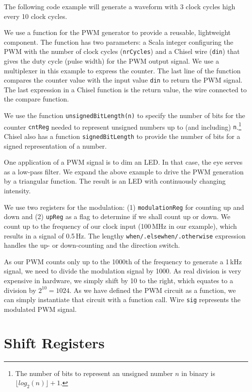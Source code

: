 \documentclass[%
    10pt,
    headinclude, footinclude=false,
    openright, %
    notitlepage,
    cleardoublepage=empty,
    headsepline,
    numbers=noenddot,
    bibliography=totoc, index=totoc,
    ]{scrbook}
\newcommand{\code}[1]{{\lstinline[basicstyle=\small\ttfamily]{#1}}}
\begin{document}
The following code example will generate a waveform with 3 clock cycles high every 10 clock cycles.


\noindent We use a function for the PWM generator to provide a reusable, lightweight component.
The function has two parameters: a Scala integer configuring the PWM with the number of
clock cycles (\code{nrCycles}) and a Chisel wire (\code{din}) that gives the duty cycle (pulse width) for the
PWM output signal. We use a multiplexer in this
example to express the counter. The last line of the function compares the counter value
with the input value \code{din} to return the PWM signal. The last expression in a Chisel function
is the return value, the wire connected to the compare function.

We use the function \code{unsignedBitLength(n)} to specify the number of bits for the counter
\code{cntReg} needed to represent unsigned numbers up to (and including)
\code{n}.\footnote{The number of bits to represent an unsigned number $n$ in binary is $\lfloor log_2(n) \rfloor + 1$.}
Chisel also has a function \code{signedBitLength} to provide the number of bits
for a signed representation of a number.


One application of a PWM signal is to dim an LED. In that case, the eye serves as a low-pass
filter. We expand the above example to drive the PWM generation by a triangular function.
The result is an LED with continuously changing intensity.


We use two registers for the modulation: (1) \code{modulationReg} for counting up and down
and (2) \code{upReg} as a flag to determine if we shall count up or down. We count up
to the frequency of our clock input (100\,MHz in our example), which results in a signal
of 0.5\,Hz. The lengthy \code{when/.elsewhen/.otherwise} expression handles the up- or
down-counting and the direction switch.

As our PWM counts only up to the 1000th of the frequency to generate a 1\,kHz signal,
we need to divide the modulation signal by 1000. As real division is very expensive in hardware,
we simply shift by 10 to the right, which equates to a division by $2^{10} = 1024$.
As we have defined the PWM circuit as a function, we can simply instantiate that circuit
with a function call. Wire \code{sig} represents the modulated PWM signal.

\section{Shift Registers}
\end{document}
